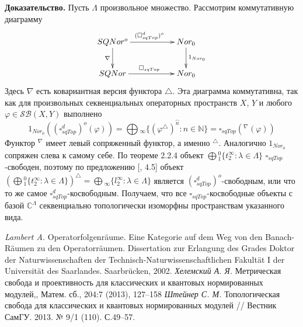 \documentclass[12pt]{article}
\begin{document}
{\bf Доказательство.} Пусть $\Lambda$ произвольное множество. Рассмотрим
коммутативную диаграмму
$$
\xymatrix{
SQNor^o \ar[d]_{\nabla }   %
\ar[rr]^{(\square_{sqTop}^d)^o}  %
 & & {Nor_0} \ar[d]^{1_{Nor_0}}\\  %
SQNor\ar[rr]^{\square_{sqTop}} & & {Nor_0}}  %
$$
Здесь $\nabla$ есть ковариантная версия функтора $\triangle$. Эта диаграмма
коммутативна, так как для произвольных секвенциальных операторных пространств
$X$, $Y$ и любого $\varphi\in\mathcal{SB}(X,Y)$ выполнено
$$
1_{Nor_0}({(\square_{sqTop}^d)}^o(\varphi))
=\bigoplus{}_\infty  \{{(\varphi^\triangle )}^{\wideparen{n}} : n \in \mathbb{N} \}
=\square_{sqTop}({}^\nabla(\varphi))
$$
Функтор ${}^\nabla$ имеет левый сопряженный функтор, а именно ${}^\triangle$.
Аналогично $1_{Nor_0}$ сопряжен слева к самому себе. По теореме 2.2.4 объект
$\bigoplus{}_1^0 \{t_2^\infty:\lambda\in\Lambda \}$ $\square_{sqTop}$-свободен,
поэтому по предложению [\cite{HelMetrFrQmod}, 4.5] объект
${(\bigoplus{}_1^0 \{t_2^\infty:\lambda\in\Lambda \})}^\triangle
=\bigoplus{}_\infty \{l_2^\infty:\lambda\in\Lambda \}$
является ${(\square_{sqTop}^d)}^o$-свободным, или что то же самое
$\square_{sqTop}^d$-косвободным. Получаем, что все $\square_{sqTop}$-косвободные
объекты с базой $\mathbb{C}^\Lambda$ секвенциально топологически изоморфны
пространствам указанного вида.

\begin{thebibliography}{99}
\textit{Lambert A.} Operatorfolgenr\"{a}ume. Eine Kategorie
auf dem Weg von den Banach-R\"{a}umen zu den Operatorr\"{a}umen. Dissertation
zur Erlangung des Grades Doktor der Naturwissenschaften der
Technisch-Naturwissenschaftlichen Fakult\"{a}t I der Universit\"{a}t des
Saarlandes. Saarbr\"{u}cken, 2002.
\textit{Хелемский А. Я.} Метрическая свобода и проективность для классических и
квантовых нормированных модулей,, Матем. сб., 204:7 (2013), 127–158 
\textit{Штейнер С. М.} 
Топологическая свобода для классических и квантовых нормированных модулей //
Вестник СамГУ. 2013. № 9/1 (110). С.49--57.
\end{thebibliography}
\end{document}
